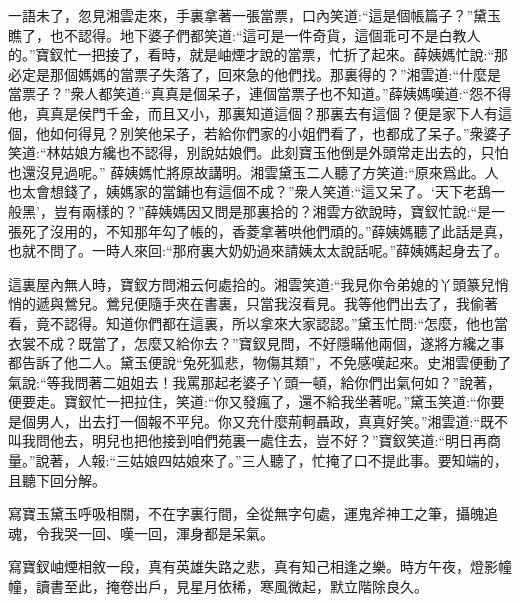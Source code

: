 \begin{parag}
    一語未了，忽見湘雲走來，手裏拿著一張當票，口內笑道:“這是個帳篇子？”黛玉瞧了，也不認得。地下婆子們都笑道:“這可是一件奇貨，這個乖可不是白教人的。”寶釵忙一把接了，看時，就是岫煙才說的當票，忙折了起來。薛姨媽忙說:“那必定是那個媽媽的當票子失落了，回來急的他們找。那裏得的？”湘雲道:“什麼是當票子？”衆人都笑道:“真真是個呆子，連個當票子也不知道。”薛姨媽嘆道:“怨不得他，真真是侯門千金，而且又小，那裏知道這個？那裏去有這個？便是家下人有這個，他如何得見？別笑他呆子，若給你們家的小姐們看了，也都成了呆子。”衆婆子笑道:“林姑娘方纔也不認得，別說姑娘們。此刻寶玉他倒是外頭常走出去的，只怕也還沒見過呢。” 薛姨媽忙將原故講明。湘雲黛玉二人聽了方笑道:“原來爲此。人也太會想錢了，姨媽家的當鋪也有這個不成？”衆人笑道:“這又呆了。‘天下老鴰一般黑’，豈有兩樣的？”薛姨媽因又問是那裏拾的？湘雲方欲說時，寶釵忙說:“是一張死了沒用的，不知那年勾了帳的，香菱拿著哄他們頑的。”薛姨媽聽了此話是真，也就不問了。一時人來回:“那府裏大奶奶過來請姨太太說話呢。”薛姨媽起身去了。
\end{parag}


\begin{parag}
    這裏屋內無人時，寶釵方問湘云何處拾的。湘雲笑道:“我見你令弟媳的丫頭篆兒悄悄的遞與鶯兒。鶯兒便隨手夾在書裏，只當我沒看見。我等他們出去了，我偷著看，竟不認得。知道你們都在這裏，所以拿來大家認認。”黛玉忙問:“怎麼，他也當衣裳不成？既當了，怎麼又給你去？”寶釵見問，不好隱瞞他兩個，遂將方纔之事都告訴了他二人。黛玉便說“兔死狐悲，物傷其類”，不免感嘆起來。史湘雲便動了氣說:“等我問著二姐姐去！我罵那起老婆子丫頭一頓，給你們出氣何如？”說著，便要走。寶釵忙一把拉住，笑道:“你又發瘋了，還不給我坐著呢。”黛玉笑道:“你要是個男人，出去打一個報不平兒。你又充什麼荊軻聶政，真真好笑。”湘雲道:“既不叫我問他去，明兒也把他接到咱們苑裏一處住去，豈不好？”寶釵笑道:“明日再商量。”說著，人報:“三姑娘四姑娘來了。”三人聽了，忙掩了口不提此事。要知端的，且聽下回分解。
\end{parag}


\begin{parag}
    \begin{note}寫寶玉黛玉呼吸相關，不在字裏行間，全從無字句處，運鬼斧神工之筆，攝魄追魂，令我哭一回、嘆一回，渾身都是呆氣。\end{note}
\end{parag}


\begin{parag}
    \begin{note}寫寶釵岫煙相敘一段，真有英雄失路之悲，真有知己相逢之樂。時方午夜，燈影幢幢，讀書至此，掩卷出戶，見星月依稀，寒風微起，默立階除良久。\end{note}
\end{parag}
